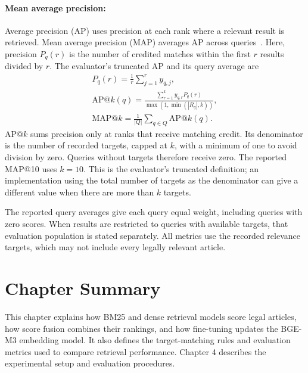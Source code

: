 \paragraph{Mean average precision:}
Average precision (AP) uses precision at each rank where a relevant result is retrieved. Mean average precision (MAP) averages AP across queries~\cite{manning2008}. Here, precision \(P_q(r)\) is the number of credited matches within the first \(r\) results divided by \(r\). The evaluator's truncated AP and its query average are
\[
\begin{gathered}
P_q(r)=\frac{1}{r}\sum_{j=1}^{r}y_{q,j},\\
\mathrm{AP}@k(q)=\frac{\sum_{r=1}^{k}y_{q,r}P_q(r)}{\max(1,\min(|R_q|,k))},\\
\mathrm{MAP}@k=\frac{1}{|Q|}\sum_{q\in Q}\mathrm{AP}@k(q).
\end{gathered}
\]
AP@\(k\) sums precision only at ranks that receive matching credit. Its denominator is the number of recorded targets, capped at \(k\), with a minimum of one to avoid division by zero. Queries without targets therefore receive zero. The reported MAP@10 uses \(k=10\). This is the evaluator's truncated definition; an implementation using the total number of targets as the denominator can give a different value when there are more than \(k\) targets.

The reported query averages give each query equal weight, including queries with zero scores. When results are restricted to queries with available targets, that evaluation population is stated separately. All metrics use the recorded relevance targets, which may not include every legally relevant article.

\section{Chapter Summary}

This chapter explains how BM25 and dense retrieval models score legal articles, how score fusion combines their rankings, and how fine-tuning updates the BGE-M3 embedding model. It also defines the target-matching rules and evaluation metrics used to compare retrieval performance. Chapter 4 describes the experimental setup and evaluation procedures.
